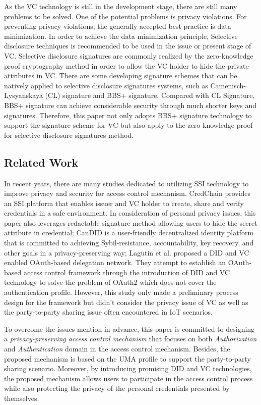 \documentclass[conference, dvipdfmx]{IEEEtran} %
\begin{document}
\begin{sloppypar}
As the VC technology is still in the development stage, there are still many problems to be solved. One of the potential problems is privacy violations.  For preventing privacy violations, the generally accepted best practice is data minimization. In order to achieve the data minimization principle, Selective disclosure techniques is recommended to be used in the issue or present stage of VC\cite{VC_model}.  {Selective disclosure signatures} are commonly realized by the zero-knowledge proof cryptography method in order to allow the VC holder to hide the private attributes in VC. There are some developing signature schemes that can be natively applied to selective disclosure signatures systems, such as Camenisch-Lysyanskaya (CL) signature\cite{cl_sig} and BBS+ signature\cite{bbs_1}. Compared with CL Signature, BBS+ signature can achieve considerable security through much shorter keys and signatures\cite{bbs_cl}. Therefore, this paper not only adopts BBS+ signature technology to support the signature scheme for VC but also apply to the zero-knowledge proof for selective disclosure signatures method. 

\subsection{Related Work}
In recent years, there are many studies dedicated to utilizing SSI technology to improve privacy and security for access control mechanism. CredChain\cite{Selective_Disclosure_paper} provides an SSI platform that enables issuer and VC holder to create, share and verify credentials in a safe environment. In consideration of personal privacy issues, this paper also leverages redactable signature\cite{redactable_signature} method allowing users to hide the secret attribute in credential; CanDID\cite{CanDID} is a user-friendly decentralized identity platform that is committed to achieving Sybil-resistance, accountability, key recovery, and other goals in a privacy-preserving way; Lagutin et al.\cite{VC_Oauth} proposed a DID and VC enabled OAuth-based delegation network. They attempt to establish an OAuth-based access control framework through the introduction of DID and VC technology to solve the problem of OAuth2 which does not cover the authentication profile.  However, this study only made a preliminary process design for the framework but didn't consider the privacy issue of VC as well as the party-to-party sharing issue often encountered in IoT scenarios.

To overcome the issues mention in advance, this paper is committed to designing a \textit{privacy-preserving access control mechanism} that focuses on both \textit{Authorization} and \textit{Authentication} domain in the access control mechanism. Besides, the proposed mechanism is based on the UMA profile to support the party-to-party sharing scenario. Moreover, by introducing promising DID and VC technologies, the proposed mechanism allows users to participate in the access control process while also protecting the privacy of the personal credentials presented by themselves.


\end{sloppypar}
\end{document}
